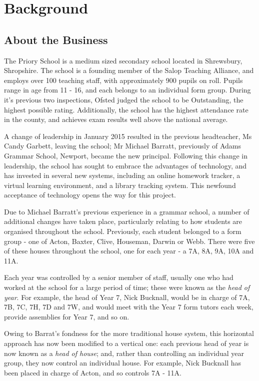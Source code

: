 \section{Background}

\subsection{About the Business}

The Priory School is a medium sized secondary school located in Shrewsbury, Shropshire. The school is a founding member of the Salop Teaching Alliance, and employs over 100 teaching staff, with approximately 900 pupils on roll. Pupils range in age from 11 - 16, and each belongs to an individual form group. During it's previous two inspections, Ofsted judged the school to be Outstanding, the highest possible rating. Additionally, the school has the highest attendance rate in the county, and achieves exam results well above the national average. 

A change of leadership in January 2015 resulted in the previous headteacher, Ms Candy Garbett, leaving the school; Mr Michael Barratt, previously of Adams Grammar School, Newport, became the new principal. Following this change in leadership, the school has sought to embrace the advantages of technology, and has invested in several new systems, including an online homework tracker, a virtual learning environment, and a library tracking system. This newfound acceptance of technology opens the way for this project.

Due to Michael Barratt's previous experience in a grammar school, a number of additional changes have taken place, particularly relating to how students are organised throughout the school. Previously, each student belonged to a form group - one of Acton, Baxter, Clive, Houseman, Darwin or Webb. There were five of these houses throughout the school, one for each year - a 7A, 8A, 9A, 10A and 11A.

 Each year was controlled by a senior member of staff, usually one who had worked at the school for a large period of time; these were known as the \textit{head of year}. For example, the head of Year 7, Nick Bucknall, would be in charge of 7A, 7B, 7C, 7H, 7D and 7W, and would meet with the Year 7 form tutors each week, provide assemblies for Year 7, and so on. 

Owing to Barrat's fondness for the more traditional house system, this horizontal approach has now been modified to a vertical one: each previous head of year is now known as a \textit{head of house}; and, rather than controlling an individual year group, they now control an individual house. For example, Nick Bucknall has been placed in charge of Acton, and so controls 7A - 11A.

